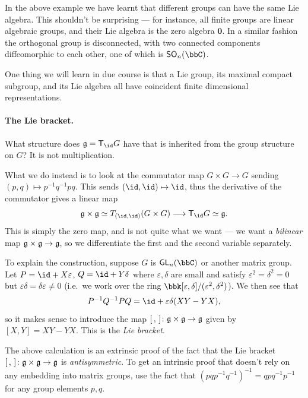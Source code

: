 In the above example we have learnt that different groups can have the same Lie
algebra. This shouldn't be surprising --- for instance, all finite groups are
linear algebraic groups, and their Lie algebra is the zero algebra $\mathbf{0}$.
In a similar fashion the orthogonal group is disconnected, with two connected
components diffeomorphic to each other, one of which is $\sf{SO}_n(\bbC)$.

One thing we will learn in due course is that a Lie group, its maximal compact
subgroup, and its Lie algebra all have coincident finite dimensional
representations.
 

\paragraph{The Lie bracket.} What structure does $\frakg=\sf{T}_\id G$ have that is
inherited from the group structure on $G$? It is not multiplication. 

What we do instead is to look at the commutator map $G\times G\to G$ sending
$(p,q)\mapsto p^{-1}q^{-1}pq$. This sends $(\id,\id)\mapsto \id$, thus the
derivative of the commutator gives a linear map 
\[
    \frakg\times \frakg \simeq T_{(\id,\id)}(G\times
    G)\longrightarrow \sf{T}_\id G \simeq \frakg.
\]
This is simply the zero map, and is not quite what we want --- we want a
\emph{bilinear} map $\mathfrak{g}\times \mathfrak{g}\to \mathfrak{g}$, so we differentiate
the first and the second variable separately.

To explain the construction, suppose $G$ is $\sf{GL}_n(\bbC)$ or another matrix
group. Let $P=\id + X\varepsilon$, $Q=\id + Y\delta$ where $\varepsilon, \delta$
are small and satisfy $\varepsilon^2=\delta^2=0$ but
$\varepsilon\delta=\delta\varepsilon\neq 0$ (i.e.\ we work over
the ring $\bbk[\varepsilon, \delta]/(\varepsilon^2,\delta^2)$). We then see that
\[
    P^{-1}Q^{-1}PQ=\id + \varepsilon\delta (XY-YX),
\]
so it makes sense to introduce the map
$[\,,\,]\colon \mathfrak{g}\times
\mathfrak{g}\to \mathfrak{g}$ given by $[X,Y]=XY-YX$. This is the \emph{Lie bracket}.

\begin{exercise}
    The above calculation is an extrinsic proof of the fact that the Lie
    bracket $[\,,\,]\colon\mathfrak{g}\times \mathfrak{g} \to \mathfrak{g}$ is \emph{antisymmetric}. To get an intrinsic proof that doesn't rely
    on any embedding into matrix groups, use the fact that
    $(pqp^{-1}q^{-1})^{-1}=qpq^{-1}p^{-1}$ for any group elements $p,q$.
\end{exercise}

